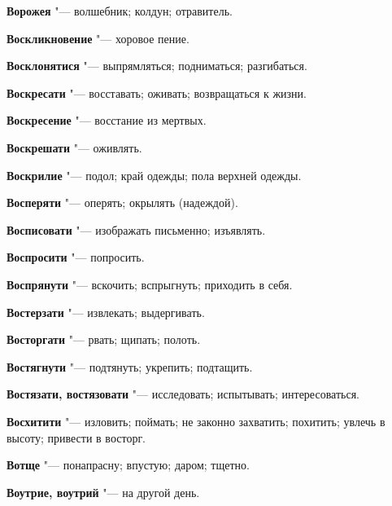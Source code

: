 \begin{mymulticols}{2}
\noindent\textbf{Ворожея} "--- волшебник; колдун; отравитель. 




\noindent\textbf{Воскликновение} "--- хоровое пение. 




\noindent\textbf{Восклонятися} "--- выпрямляться; подниматься; разгибаться. 




\noindent\textbf{Воскресати} "--- восставать; оживать; возвращаться к жизни. 




\noindent\textbf{Воскресение} "--- восстание из мертвых. 




\noindent\textbf{Воскрешати} "--- оживлять. 




\noindent\textbf{Воскрилие} "--- подол; край одежды; пола верхней одежды. 




\noindent\textbf{Восперяти} "--- оперять; окрылять (надеждой). 




\noindent\textbf{Восписовати} "--- изображать письменно; изъявлять. 




\noindent\textbf{Воспросити} "--- попросить. 




\noindent\textbf{Воспрянути} "--- вскочить; вспрыгнуть; приходить в себя. 




\noindent\textbf{Востерзати} "--- извлекать; выдергивать. 




\noindent\textbf{Восторгати} "--- рвать; щипать; полоть. 




\noindent\textbf{Востягнути} "--- подтянуть; укрепить; подтащить. 




\noindent\textbf{Востязати, востязовати} "--- исследовать; испытывать; интересоваться. 




\noindent\textbf{Восхитити} "--- изловить; поймать; не законно захватить; похитить; увлечь в высоту; привести в восторг. 




\noindent\textbf{Вотще} "--- понапрасну; впустую; даром; тщетно. 




\noindent\textbf{Воутрие, воутрий} "--- на другой день. 





\end{mymulticols}
